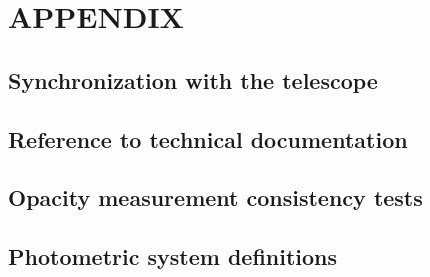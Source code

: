 \documentclass[a4paper, 11pt]{report}
\begin{document}
\chapter{APPENDIX}

  \section{Synchronization with the telescope}
  \label{ap:synchro}
  
  
  \section{Reference to technical documentation}
  \label{ap:doc}
  

  \section{Opacity measurement consistency tests}
  \label{ap:opacity}
  
  \clearpage
  
  
  \clearpage
  
  \section{Photometric system definitions}
  \label{ap:cal_HA}
  
  
  

  
%  
  \clearpage
  
  
  
  \clearpage
  

  

  

  

\clearpage

%



\end{document}
